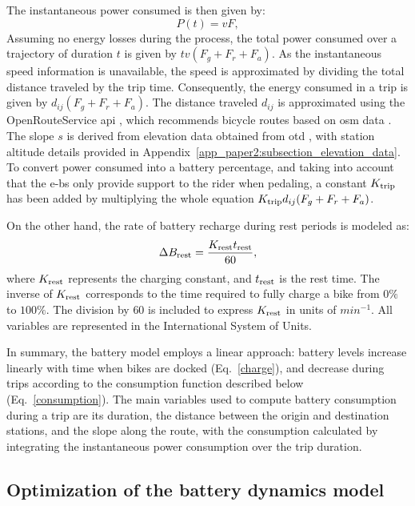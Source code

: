       The instantaneous power consumed is then given by:
      \begin{equation}
      P(t)=vF,
      \end{equation}
      Assuming no energy losses during the process, the total power consumed over a trajectory of duration $t$ is given by $tv(F_g+F_r+F_a)$. As the instantaneous speed information is unavailable, the speed is approximated by dividing the total distance traveled by the trip time. Consequently, the energy consumed in a trip is given by $d_{ij}(F_g+F_r+F_a)$. The distance traveled $d_{ij}$ is approximated using the OpenRouteService \ac{api} \cite{OpenRouteService_2023}, which recommends bicycle routes based on \ac{osm} data \cite{OpenStreetMap_2023}. The slope $s$ is derived from elevation data obtained from \ac{otd} \cite{OpenTopoData_2023}, with station altitude details provided in Appendix~\ref{app_paper2:subsection_elevation_data}. To convert power consumed into a battery percentage, and taking into account that the \acp{e-b} only provide support to the rider when pedaling, a constant $K_{\rm trip}$ has been added by multiplying the whole equation $K_{\rm trip}d_{ij}(F_g+F_r+F_a)$.

      On the other hand, the rate of battery recharge during rest periods is modeled as:
      \begin{equation}
      \Delta B_{\rm rest}=\frac{K_{\rm rest}t_{\rm rest}}{60}, \label{charge}
      \end{equation}
      where $K_{\rm rest}$ represents the charging constant, and $t_{\rm rest}$ is the rest time. The inverse of $K_{\rm rest}$ corresponds to the time required to fully charge a bike from $0\%$ to $100\%$. The division by $60$ is included to express $K_{\rm rest}$ in units of $min^{-1}$. All variables are represented in the International System of Units.

      In summary, the battery model employs a linear approach: battery levels increase linearly with time when bikes are docked (Eq.~\ref{charge}), and decrease during trips according to the consumption function described below (Eq.~\ref{consumption}). The main variables used to compute battery consumption during a trip are its duration, the distance between the origin and destination stations, and the slope along the route, with the consumption calculated by integrating the instantaneous power consumption over the trip duration.
    
      
      
    \subsection{Optimization of the battery dynamics model}
    \label{sec:battery_optimization}

